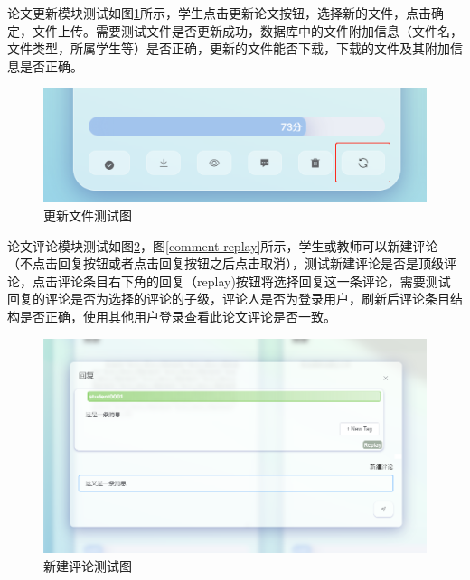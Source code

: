论文更新模块测试如图\ref{file-refresh-test}所示，学生点击更新论文按钮，选择新的文件，点击确定，文件上传。需要测试文件是否更新成功，数据库中的文件附加信息（文件名，文件类型，所属学生等）是否正确，更新的文件能否下载，下载的文件及其附加信息是否正确。

\begin{figure}[htbp]
  \centering
  \includegraphics[scale = 0.6]{out/figure/测试/file-refresh-test.png}
  \caption{\song\wuhao 更新文件测试图}
  \label{file-refresh-test}
\end{figure}

论文评论模块测试如图\ref{comment-add}，图\ref{comment-replay}所示，学生或教师可以新建评论（不点击回复按钮或者点击回复按钮之后点击取消），测试新建评论是否是顶级评论，点击评论条目右下角的回复（replay)按钮将选择回复这一条评论，需要测试回复的评论是否为选择的评论的子级，评论人是否为登录用户，刷新后评论条目结构是否正确，使用其他用户登录查看此论文评论是否一致。

\begin{figure}
  \centering
  \includegraphics[scale = 0.6]{out/figure/测试/comment-add.png}
  \caption{\song\wuhao 新建评论测试图}
  \label{comment-add}
\end{figure}

